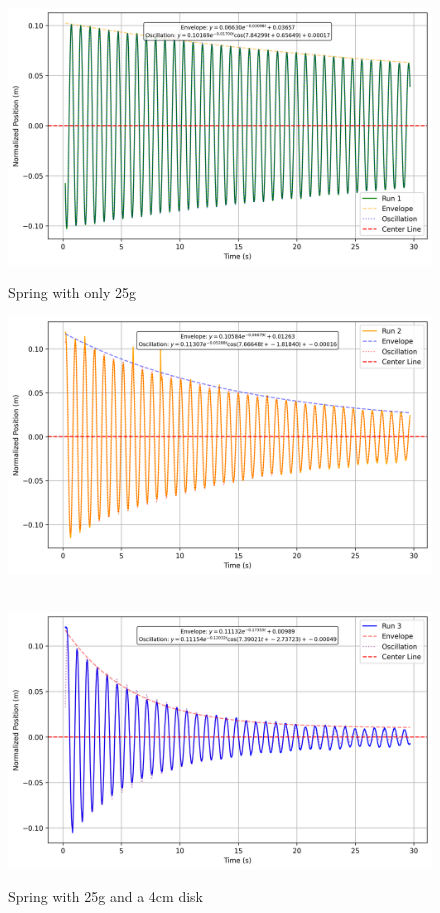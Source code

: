 \documentclass[12pt,letterpaper]{article}
\begin{document}
\begin{figure}[]
  \includegraphics[width=\linewidth]{images/2cm.png}
  \caption{Spring with only 25g}\label{fig:2cm}
\endminipage\hfill
{}
  \includegraphics[width=\linewidth]{images/4cm.png}
  \caption{Spring with 25g and a 4cm disk}\label{fig:4cm}
\endminipage\hfill
\\
  \includegraphics[width=\linewidth]{images/6cm.png}

\end{figure}
\end{document}
